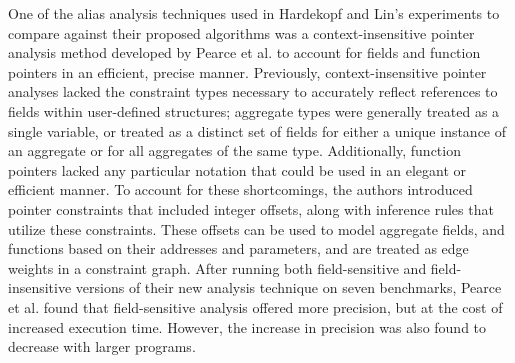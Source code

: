 One of the alias analysis techniques used in Hardekopf and Lin's experiments to compare against their proposed algorithms was a context-insensitive pointer analysis method developed by Pearce et al. \cite{Pearce} to account for fields and function pointers in an efficient, precise manner. Previously, context-insensitive pointer analyses lacked the constraint types necessary to accurately reflect references to fields within user-defined structures; aggregate types were generally treated as a single variable, or treated as a distinct set of fields for either a unique instance of an aggregate or for all aggregates of the same type. Additionally, function pointers lacked any particular notation that could be used in an elegant or efficient manner. To account for these shortcomings, the authors introduced pointer constraints that included integer offsets, along with inference rules that utilize these constraints. These offsets can be used to model aggregate fields, and functions based on their addresses and parameters, and are treated as edge weights in a constraint graph. After running both field-sensitive and field-insensitive versions of their new analysis technique on seven benchmarks, Pearce et al. found that field-sensitive analysis offered more precision, but at the cost of increased execution time. However, the increase in precision was also found to decrease with larger programs.
